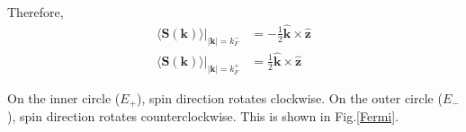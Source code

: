 \documentclass{article}
\begin{document}
Therefore,
\begin{align*}
\langle\mathbf{S}(\mathbf{k})\rangle|_{|\mathbf{k}|=k_F^-}&=-\frac{1}{2}\hat{\mathbf{k}}\times\hat{\mathbf{z}}\\
\langle\mathbf{S}(\mathbf{k})\rangle|_{|\mathbf{k}|=k_F^+}&=\frac{1}{2}\hat{\mathbf{k}}\times\hat{\mathbf{z}}
\end{align*}

On the inner circle ($E_+$), spin direction rotates clockwise. On the outer circle ($E_-$), spin direction rotates counterclockwise. This is shown in Fig.\ref{Fermi}.
\end{document}

